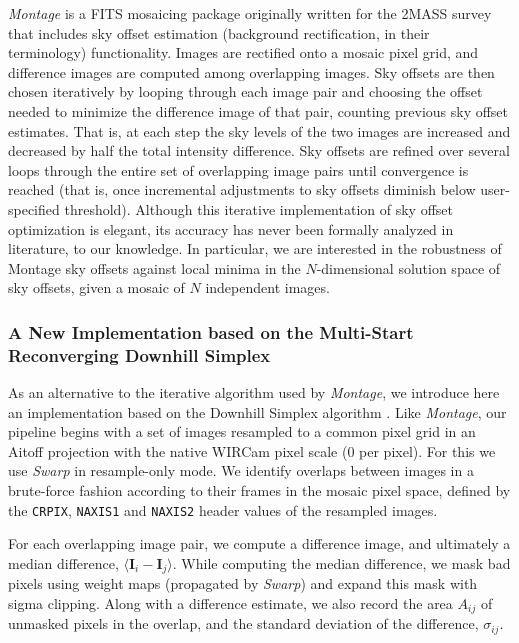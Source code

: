 \documentclass[iop]{emulateapj}
\newcommand{\vect}[1]{\boldsymbol{#1}} %
\newcommand{\sw}[1]{\textit{#1}} %
\begin{document}
\sw{Montage} is a FITS mosaicing package \citep{Berriman:2008} originally written for the 2MASS survey that includes sky offset estimation (background rectification, in their terminology) functionality.
Images are rectified onto a mosaic pixel grid, and difference images are computed among overlapping images.
Sky offsets are then chosen iteratively by looping through each image pair and choosing the offset needed to minimize the difference image of that pair, counting previous sky offset estimates.
That is, at each step the sky levels of the two images are increased and decreased by half the total intensity difference.
Sky offsets are refined over several loops through the entire set of overlapping image pairs until convergence is reached (that is, once incremental adjustments to sky offsets diminish below user-specified threshold).
Although this iterative implementation of sky offset optimization is elegant, its accuracy has never been formally analyzed in literature, to our knowledge.
In particular, we are interested in the robustness of Montage sky offsets against local minima in the $N$-dimensional solution space of sky offsets, given a mosaic of $N$ independent images.

\subsubsection{A New Implementation based on the Multi-Start Reconverging Downhill Simplex}
\label{sec:msrnm_algo}

As an alternative to the iterative algorithm used by \sw{Montage}, we introduce here an implementation based on the Downhill Simplex algorithm \cite[][hereafter, NM]{Nelder:1965}.
Like \sw{Montage}, our pipeline begins with a set of images resampled to a common pixel grid in an Aitoff projection with the native WIRCam pixel scale (0 per pixel).
For this we use \sw{Swarp} in resample-only mode.
We identify overlaps between images in a brute-force fashion according to their frames in the mosaic pixel space, defined by the \texttt{CRPIX}, \texttt{NAXIS1} and \texttt{NAXIS2} header values of the resampled images.

For each overlapping image pair, we compute a difference image, and ultimately a median difference, $\langle \vect{I}_i - \vect{I}_j \rangle$.
While computing the median difference, we mask bad pixels using weight maps (propagated by \sw{Swarp}) and expand this mask with sigma clipping.
Along with a difference estimate, we also record the area $A_{ij}$ of unmasked pixels in the overlap, and the standard deviation of the difference, $\sigma_{ij}$.
\end{document}
